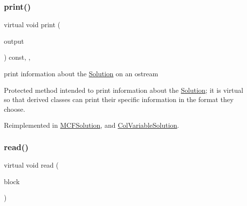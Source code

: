 \mbox{\label{class_s_m_spp__di__unipi__it_1_1_solution_a2e7b9c9148a98c5c342e8c25cac95926}} 
\subsubsection{\texorpdfstring{print()}{print()}}
{\footnotesize\ttfamily virtual void print (\begin{DoxyParamCaption}\item[{std\+::ostream \&}]{output }\end{DoxyParamCaption}) const\hspace{0.3cm}{\ttfamily [inline]}, {\ttfamily [protected]}, {\ttfamily [virtual]}}



print information about the \mbox{\hyperlink{class_s_m_spp__di__unipi__it_1_1_solution}{Solution}} on an ostream 

Protected method intended to print information about the \mbox{\hyperlink{class_s_m_spp__di__unipi__it_1_1_solution}{Solution}}; it is virtual so that derived classes can print their specific information in the format they choose. 

Reimplemented in \mbox{\hyperlink{class_s_m_spp__di__unipi__it_1_1_m_c_f_solution_a617885c1d228e0ca67bbb0efdbe713e3}{M\+C\+F\+Solution}}, and \mbox{\hyperlink{class_s_m_spp__di__unipi__it_1_1_col_variable_solution_a59a9fcbf8f9f86d348344b2073644b0e}{Col\+Variable\+Solution}}.

\mbox{\label{class_s_m_spp__di__unipi__it_1_1_solution_ae22668fc6d3d5794e6a881953898aa6b}} 
\subsubsection{\texorpdfstring{read()}{read()}}
{\footnotesize\ttfamily virtual void read (\begin{DoxyParamCaption}\item[{const \mbox{\hyperlink{class_s_m_spp__di__unipi__it_1_1_block}{Block}} $\ast$const}]{block }\end{DoxyParamCaption})\hspace{0.3cm}{\ttfamily [pure virtual]}}



